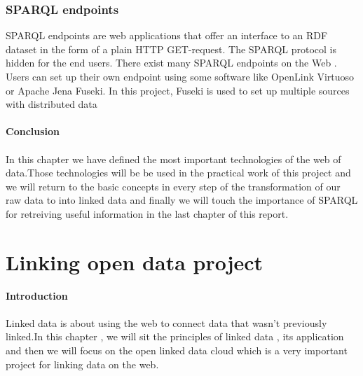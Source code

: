 \documentclass[a4paper,12pt,oneside]{report}
\begin{document}
{{{\subsection{SPARQL endpoints}
{SPARQL endpoints are web applications that offer an interface to an RDF dataset in the form of a plain HTTP GET-request. The SPARQL protocol is hidden for the end users. There exist many SPARQL endpoints on the Web . Users can set up their own endpoint using some
software like OpenLink Virtuoso  or Apache Jena Fuseki. In this project, Fuseki is used to set up multiple sources with distributed data}\\ \\
\textbf{\large Conclusion}\\ \\

{In this chapter we have defined the most important technologies of the web of data.Those technologies will be be used in the practical work of this project  and we will return to the basic concepts in every step of the transformation of our raw data to  into linked data  and finally  we will touch the importance of SPARQL for retreiving useful information in the  last chapter of this report.}

\chapter{Linking open data project}
\textbf{\large Introduction}\\ \\

{Linked data is about using the web to connect data that wasn't previously linked.In this chapter , we will sit the principles of linked data  , its application  and then we will focus on the open linked data cloud which is a very important project for linking data on the web.}
}}}
\end{document}
